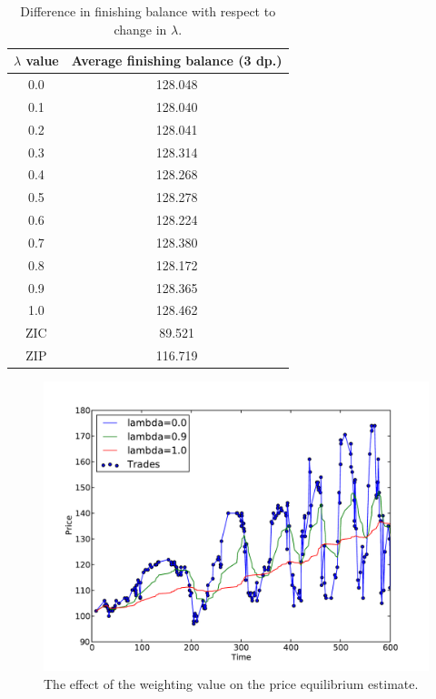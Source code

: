 \documentclass[preprint]{acm_proc_article-sp} %
\begin{document}
\begin{table}[H]
  \centering
  \begin{tabular}{ | c | c | }
    \hline
    \textbf{$\lambda$ value} & \textbf{Average finishing balance (3 dp.)} \\
    \hline
        0.0 & 128.048 \\
        0.1 & 128.040 \\
        0.2 & 128.041 \\
        0.3 & 128.314 \\
        0.4 & 128.268 \\
        0.5 & 128.278 \\
        0.6 & 128.224 \\
        0.7 & 128.380 \\
        0.8 & 128.172 \\
        0.9 & 128.365 \\
        1.0 & 128.462 \\
    \hline \hline
        ZIC &  89.521 \\
        ZIP & 116.719 \\
    \hline
  \end{tabular}
  \caption{Difference in finishing balance with respect to change in $\lambda$.}
  \label{tbl:lambda_results}
\end{table}

\begin{figure}[H]
  \centering
  \includegraphics[width=\columnwidth]{graphs_and_stats/graph_equilibriums.pdf}
  \caption{The effect of the weighting value on the price equilibrium
  \label{fig:equilibrium}
  estimate.}
\end{figure}
\end{document}
